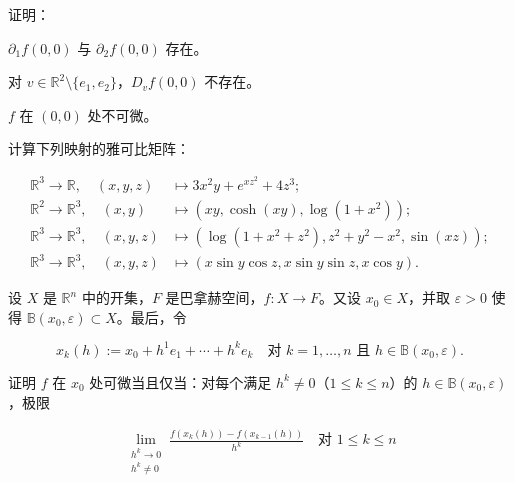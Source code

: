 \begin{exercises}
证明：

\begin{items}
\item

$ \partial_{1} f(0,0) $ 与 $ \partial_{2} f(0,0) $ 存在。

\item

对 $ v \in \mathbb{R}^{2}\setminus\{e_{1},e_{2}\} $，$ D_{v} f(0,0) $ 不存在。

\item

$ f $ 在 $ (0,0) $ 处不可微。

\end{items}

\item

计算下列映射的雅可比矩阵：

\begin{equation*}
\begin{aligned}
\mathbb{R}^{3} \to \mathbb{R} , \quad (x,y,z) &\mapsto 3x^{2}y + e^{xz^{2}} + 4z^{3} ; \\ \mathbb{R}^{2} \to \mathbb{R}^{3} , \quad (x,y) &\mapsto \left(xy, \cosh(xy), \log(1 + x^{2})\right) ; \\ \mathbb{R}^{3} \to \mathbb{R}^{3} , \quad (x,y,z) &\mapsto \left(\log(1 + x^{2} + z^{2}), z^{2} + y^{2} - x^{2}, \sin(xz)\right) ; \\ \mathbb{R}^{3} \to \mathbb{R}^{3} , \quad (x,y,z) &\mapsto \left(x\sin y\cos z, x\sin y\sin z, x\cos y\right) .
\end{aligned}
\end{equation*}
\item

设 $ X $ 是 $ \mathbb{R}^{n} $ 中的开集，$ F $ 是巴拿赫空间，$ f : X \to F $。又设 $ x_{0} \in X $，并取 $ \varepsilon > 0 $ 使得 $ \mathbb{B}(x_{0},\varepsilon) \subset X $。最后，令

\[
x_{k}(h) := x_{0} + h^{1}e_{1} + \cdots + h^{k}e_{k} \quad \text{对 } k = 1,\ldots,n \text{ 且 } h \in \mathbb{B}(x_{0},\varepsilon) .
\]

证明 $ f $ 在 $ x_{0} $ 处可微当且仅当：对每个满足 $ h^{k} \ne 0 $（$ 1 \le k \le n $）的 $ h \in \mathbb{B}(x_{0},\varepsilon) $，极限

\begin{equation*}
\begin{aligned}
\lim_{\substack{h^{k} \to 0 \\ h^{k} \ne 0}} \frac{f\left(x_{k}(h)\right) - f\left(x_{k-1}(h)\right)}{h^{k}} \quad \text{对 } 1 \le k \le n
\end{aligned}
\end{equation*}


\end{exercises}
